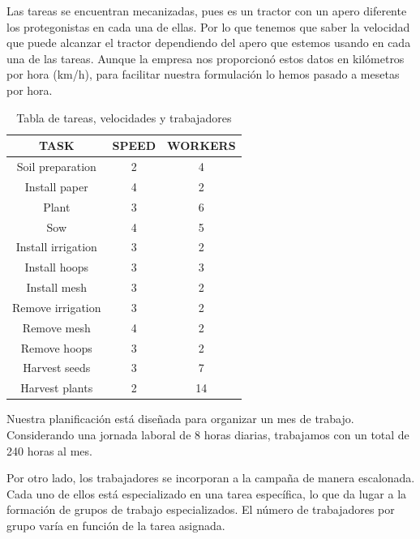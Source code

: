 Las tareas se encuentran mecanizadas, pues es un tractor con un apero diferente los protegonistas en cada una de ellas. Por lo que tenemos 
que saber la velocidad que puede alcanzar el tractor dependiendo del apero que estemos usando en cada una de las tareas. 
 Aunque la empresa nos proporcionó estos datos en kilómetros por hora (km/h), para facilitar nuestra formulación lo hemos pasado a mesetas por hora.

 \begin{table}[ht!]
    \centering
    \begin{minipage}{0.48\textwidth}
        \centering
        \begin{tabular}{|c|c|c|}
            \hline
            \rowcolor{gray!30} \textbf{\textcolor{grey3}{TASK}} & \textbf{\textcolor{grey3}{SPEED}} &  \textbf{\textcolor{grey3}{WORKERS}}\\ 
            \hline
            Soil preparation   & 2 & 4 \\ \hline
            Install paper      & 4 & 2\\ \hline
            Plant              & 3 & 6\\ \hline
            Sow                & 4 & 5\\ \hline
            Install irrigation & 3 & 2 \\ \hline
            Install hoops      & 3 & 3 \\ \hline
            Install mesh       & 3 & 2 \\ \hline
            Remove irrigation  & 3 & 2 \\ \hline
            Remove mesh        & 4 & 2 \\ \hline
            Remove hoops       & 3 & 2 \\ \hline
            Harvest seeds      & 3 & 7 \\ \hline
            Harvest plants     & 2 & 14 \\ 
            \hline
        \end{tabular}
        \caption{Tabla de tareas, velocidades y trabajadores}
        \label{tab:tareas}
    \end{minipage}
    \hfill
\end{table}
Nuestra planificación está diseñada para organizar un mes de trabajo. Considerando una jornada laboral de 8 horas diarias, 
trabajamos con un total de 240 horas al mes.

Por otro lado, los trabajadores se incorporan a la campaña de manera escalonada. Cada uno de ellos está especializado en una 
tarea específica, lo que da lugar a la formación de grupos de trabajo especializados. El número de trabajadores por grupo varía 
en función de la tarea asignada.

